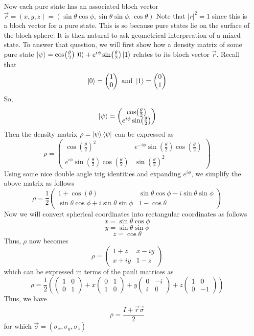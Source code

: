 \documentclass{article}
\begin{document}
Now each pure state has an associated bloch vector
\(\vec{r} = (x,y,z) = (\sin\theta \cos\phi,\sin\theta \sin\phi, \cos\theta )\)
Note that \(|r|^2 = 1\) since this is a bloch vector for a pure state. This is so
because pure states lie on the surface of the bloch sphere. It is then natural to
ask geometrical interpreation of a mixed state. To answer that question, we will
first show how a density matrix of some pure state
\(\ket{\psi} = \cos(\frac{\theta}{2})\ket{0} + e^{i\phi}\sin(\frac{\theta}{2})\ket{1}\) relates to its
bloch vector \(\vec{r}\). Recall that
\[\ket{0} = \begin{pmatrix}
  1\\0
\end{pmatrix}
\text{ and }
\ket{1} = \begin{pmatrix}
  0\\1
\end{pmatrix}\]
So, \[\ket{\psi} = \begin{pmatrix}
  \cos(\frac{\theta}{2}) \\
  e^{i\phi}\sin(\frac{\theta}{2})
\end{pmatrix}\]
Then the density matrix \(\rho = \ket{\psi}\bra{\psi}\) can be expressed as
\[\rho = \begin{pmatrix}
  \cos(\frac{\theta}{2})^2 & e^{-i\phi}\sin(\frac{\theta}{2})\cos(\frac{\theta}{2})\\
  e^{i\phi}\sin(\frac{\theta}{2})\cos(\frac{\theta}{2}) & \sin(\frac{\theta}{2})^2
\end{pmatrix}\]
Using some nice double angle trig identities and expanding \(e^{i\phi}\), we simplify the above matrix as follows
\[\rho = \frac{1}{2}\begin{pmatrix}
  1+ \cos(\theta)  & \sin\theta\cos\phi - i\sin\theta\sin\phi\\
  \sin\theta\cos\phi + i\sin\theta\sin\phi & 1-\cos\theta
\end{pmatrix}\]
Now we will convert spherical coordinates into rectangular coordinates as follows
\[x= \sin\theta\cos\phi\]
\[y = \sin\theta\sin\phi\]
\[z = \cos\theta\]
Thus, \(\rho\) now becomes
\[\rho = \begin{pmatrix}
  1 + z & x-iy\\
  x+iy & 1-z
\end{pmatrix}\]
which can be expressed in terms of the pauli matrices as
\[\rho = \frac{1}{2}(\begin{pmatrix}
  1 & 0 \\
  0 & 1
\end{pmatrix} +
x\begin{pmatrix}
  0 & 1 \\
  1 & 0
\end{pmatrix} +
y\begin{pmatrix}
  0 & -i \\
  i & 0
\end{pmatrix} +
z\begin{pmatrix}
  1 & 0 \\0 & -1
\end{pmatrix})\]
Thus, we have
\[\rho = \frac{I + \vec{r}\dot\vec{\sigma}}{2}\]
for which \(\vec{\sigma} = (\sigma_x, \sigma_y, \sigma_z)\)
\end{document}
